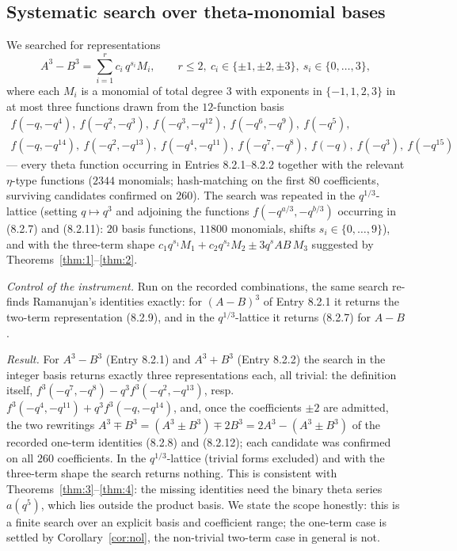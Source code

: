 \documentclass[pdflatex,sn-mathphys-num]{sn-jnl}
\theoremstyle{thmstyleone}%
\theoremstyle{thmstyletwo}%
\newcommand{\f}{f}
\begin{document}
\subsection{Systematic search over theta-monomial bases}
We searched for representations
\[
A^3-B^3=\sum_{i=1}^{r} c_i\, q^{s_i} M_i,\qquad r\le 2,\ c_i\in\{\pm1,\pm2,\pm3\},\ s_i\in\{0,\dots,3\},
\]
where each $M_i$ is a monomial of total degree $3$ with exponents in
$\{-1,1,2,3\}$ in at most three functions drawn from the $12$-function basis
\begin{gather*}
\f(-q,-q^4),\ \f(-q^2,-q^3),\ \f(-q^3,-q^{12}),\ \f(-q^6,-q^9),\ \f(-q^5),\\
\f(-q,-q^{14}),\ \f(-q^2,-q^{13}),\ \f(-q^4,-q^{11}),\ \f(-q^7,-q^8),\ \f(-q),\ \f(-q^3),\ \f(-q^{15})
\end{gather*}
--- every theta function occurring in Entries 8.2.1--8.2.2 together with the
relevant $\eta$-type functions ($2344$ monomials; hash-matching on the first
$80$ coefficients, surviving candidates confirmed on $260$). The search was
repeated in the $q^{1/3}$-lattice (setting $q\mapsto q^3$ and adjoining the
functions $\f(-q^{a/3},-q^{b/3})$ occurring in (8.2.7) and (8.2.11): $20$ basis
functions, $11800$ monomials, shifts $s_i\in\{0,\dots,9\}$), and with the
three-term shape $c_1 q^{s_1}M_1+c_2 q^{s_2}M_2\pm3q^{s}AB\,M_3$ suggested by
Theorems~\ref{thm:1}--\ref{thm:2}.

\emph{Control of the instrument.} Run on the recorded combinations, the same
search re-finds Ramanujan's identities exactly: for $(A-B)^3$ of Entry 8.2.1 it
returns the two-term representation (8.2.9), and in the $q^{1/3}$-lattice it
returns (8.2.7) for $A-B$.

\emph{Result.} For $A^3-B^3$ (Entry 8.2.1) and $A^3+B^3$ (Entry 8.2.2) the
search in the integer basis returns exactly three representations each, all trivial: the definition itself, $f^3(-q^7,-q^8)-q^3f^3(-q^2,-q^{13})$, resp.\ $f^3(-q^4,-q^{11})+q^3f^3(-q,-q^{14})$, and, once the coefficients $\pm2$ are admitted, the two rewritings $A^3\mp B^3=(A^3\pm B^3)\mp2B^3=2A^3-(A^3\pm B^3)$ of the recorded one-term identities (8.2.8) and (8.2.12); each candidate was confirmed on all $260$ coefficients. In the $q^{1/3}$-lattice (trivial forms excluded) and with the three-term shape the search returns nothing. This is
consistent with Theorems~\ref{thm:3}--\ref{thm:4}: the missing identities need
the binary theta series $a(q^5)$, which lies outside the product basis. We state the scope honestly: this is a finite search over an explicit basis and
coefficient range; the one-term case is settled by Corollary~\ref{cor:nol}, the non-trivial two-term case in general is not.
\end{document}
